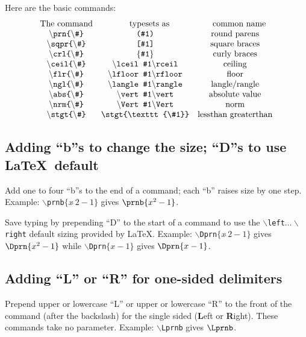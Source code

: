 \documentclass{amsart}
\begin{document}
Here are the basic commands:
\begin{equation*}
\begin{matrix}
\text{The command}&	\quad\text{ typesets as }&\quad \text{common name}\\
\backslash\texttt{prn\{$\backslash$\#\}}  &\texttt{(\#1)}                                     &\text{round parens}\\
\backslash\texttt{sqpr\{$\backslash$\#\}} &\texttt{[\#1]}                                     &\text{square braces}\\
\backslash\texttt{crl\{$\backslash$\#\}}  &\{\texttt{\#1} \}                                  &\text{curly braces}\\
\backslash\texttt{ceil\{$\backslash$\#\}} &\backslash\texttt{lceil \#1} \backslash\texttt{rceil}&\text{ceiling}\\        
\backslash\texttt{flr\{$\backslash$\#\}}  &\backslash\texttt{lfloor \#1}\backslash\texttt{rfloor}&\text{floor}\\
\backslash\texttt{ngl\{$\backslash$\#\}}  &\backslash\texttt{langle \#1}\backslash\texttt{rangle}&\text{langle/rangle}\\
\backslash\texttt{abs\{$\backslash$\#\}}  &\backslash\texttt{vert \#1} \backslash\texttt{vert}  &\text{absolute value}\\
\backslash\texttt{nrm\{$\backslash$\#\}}  &\backslash\texttt{Vert \#1}  \backslash\texttt{Vert}    &\text{norm}\\
\backslash\texttt{stgt\{$\backslash$\#\}} &\stgt{\texttt{\#1}}& \text{lessthan greaterthan}
\end{matrix}
\end{equation*}

\subsection{Adding ``b''s to change the size; ``D''s to use \LaTeX\ default}
Add one to four ``b''s to the end of a command; each ``b'' raises size by one step. Example:
\texttt{$\backslash$prnb$\{x\widehat\ 2-1\}$} gives $\prnb{x^2-1}$.

Save typing by prepending ``D'' to the start of a 
command to use the \texttt{$\backslash$left$\dots\backslash$right}
default sizing provided by \LaTeX. 
Example: \texttt{$\backslash$Dprn$\{x\widehat\ 2-1\}$} gives
 $\Dprn{x^2-1}$ while \texttt{$\backslash$Dprn$\{x-1\}$} gives $\Dprn{x-1}$. 

\subsection{Adding ``L'' or ``R'' for one-sided delimiters}
Prepend upper or lowercase ``L''  or upper or lowercase 
``R'' to the front of the command (after the backslash) for the single 
sided (\textbf{L}eft or \textbf{R}ight).  
These commands take no parameter. Example: \texttt{$\backslash$Lprnb}
gives $\Lprnb$. 
\end{document}
